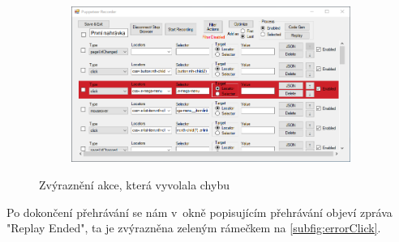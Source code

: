 \documentclass[12pt, a4paper, twoside]{article}
\begin{document}
	\vspace{-0.7cm}
	\begin{figure}[H]\ContinuedFloat
		\centering
		\textdownarrow
	\end{figure}
	\vspace{-0.6cm}
	\begin{figure}[H]\ContinuedFloat
		\centering
		\begin{subfigure}[t]{1.0\textwidth}
			\includegraphics[width=1.0\textwidth]{highlightedError.png}
		\end{subfigure}
		\caption{Zvýraznění akce, která vyvolala chybu}
	\end{figure}
	Po dokončení přehrávání se nám v~okně popisujícím přehrávání objeví zpráva "Replay Ended", ta je zvýrazněna zeleným rámečkem na \cref{subfig:errorClick}.
	
\end{document}
